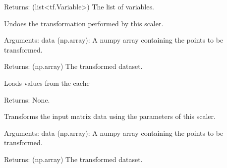 \documentclass[letterpaper,10pt,english,openany,oneside]{sphinxmanual}
\begin{document}
\begin{fulllineitems}
\begin{fulllineitems}
Returns: (list\textless{}tf.Variable\textgreater{}) The list of variables.

\end{fulllineitems}


\begin{fulllineitems}
\label{\detokenize{_modules/utils:utils.TensorStandardScaler.TensorStandardScaler.inverse_transform}}
Undoes the transformation performed by this scaler.

Arguments:
data (np.array): A numpy array containing the points to be transformed.

Returns: (np.array) The transformed dataset.

\end{fulllineitems}


\begin{fulllineitems}
\label{\detokenize{_modules/utils:utils.TensorStandardScaler.TensorStandardScaler.load_cache}}
Loads values from the cache

Returns: None.

\end{fulllineitems}


\begin{fulllineitems}
\label{\detokenize{_modules/utils:utils.TensorStandardScaler.TensorStandardScaler.transform}}
Transforms the input matrix data using the parameters of this scaler.

Arguments:
data (np.array): A numpy array containing the points to be transformed.

Returns: (np.array) The transformed dataset.

\end{fulllineitems}


\end{fulllineitems}
\end{document}
